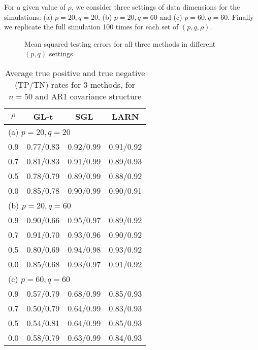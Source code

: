 For a given value of $\rho$, we consider three settings of data dimensions for the simulations: (a) $p=20, q=20$, (b) $p=20, q=60$ and (c) $p=60, q=60$. Finally we replicate the full simulation 100 times for each set of $(p,q,\rho)$.

\begin{figure}
\vspace{-1em}
\begin{center}

\caption{Mean squared testing errors for all three methods in different $(p,q)$ settings}
\label{fig:simplots}
\end{center}
\vspace{-.1in}
\end{figure}

%
\begin{table}[t]
\centering
\begin{small}
    \begin{tabular}{c|ccc}
    \hline
    $\rho$ & GL-t & SGL       & LARN      \\ \hline
    \multicolumn{4}{l}{ (a) $p=20, q=20$}\\\hline
    0.9               & 0.77/0.83          & 0.92/0.99 & 0.91/0.92 \\
    0.7               & 0.81/0.83          & 0.91/0.99 & 0.89/0.93 \\
    0.5               & 0.78/0.79          & 0.89/0.99 & 0.88/0.92 \\
    0.0               & 0.85/0.78          & 0.90/0.99 & 0.90/0.91 \\ \hline
    \multicolumn{4}{l}{ (b) $p=20, q=60$}\\\hline
    0.9               & 0.90/0.66          & 0.95/0.97 & 0.89/0.92 \\
    0.7               & 0.91/0.70          & 0.93/0.96 & 0.90/0.92 \\
    0.5               & 0.80/0.69          & 0.94/0.98 & 0.93/0.92 \\
    0.0               & 0.85/0.68          & 0.93/0.97 & 0.91/0.92 \\ \hline
    \multicolumn{4}{l}{ (c) $p=60, q=60$}\\\hline
    0.9               & 0.57/0.79          & 0.68/0.99 & 0.85/0.93 \\
    0.7               & 0.50/0.79          & 0.64/0.99 & 0.83/0.93 \\
    0.5               & 0.54/0.81          & 0.64/0.99 & 0.85/0.93 \\
    0.0               & 0.58/0.79          & 0.63/0.99 & 0.84/0.93 \\ \hline
    \end{tabular}
    \end{small}
    \caption{Average true positive and true negative (TP/TN) rates for 3 methods, for $n=50$ and AR1 covariance structure}
    \label{table:simtable2}
\end{table}

